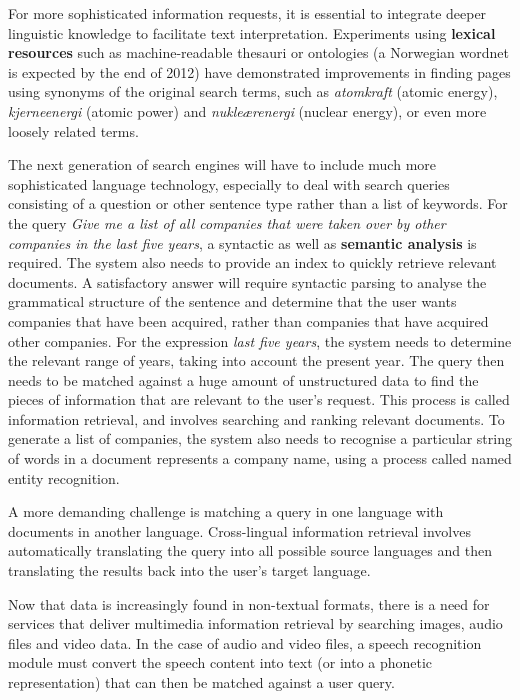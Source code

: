 \begin{multicols}{2}
For more sophisticated information requests, it is essential to integrate deeper linguistic knowledge to facilitate text interpretation. Experiments using \textbf{lexical resources} such as machine-readable thesauri or ontologies
(a Norwegian wordnet is expected by the end of 2012)
have demonstrated improvements in finding pages using synonyms of the original search terms, such as
\textit{atomkraft} (atomic energy), \textit{kjerneenergi} (atomic power) and \textit{nukleærenergi} (nuclear energy),
or even more loosely related terms.


The next generation of search engines will have to include much more sophisticated language technology, especially to deal with search queries consisting of a question or other sentence type rather than a list of keywords. For the query \textit{Give me a list of all companies that were taken over by other companies in the last five years}, a syntactic as well as \textbf{semantic analysis} is required. The system also needs to provide an index to quickly retrieve relevant documents. A satisfactory answer will require syntactic parsing to analyse the grammatical structure of the sentence and determine that the user wants companies that have been acquired, rather than companies that have acquired other companies. For the expression \textit{last five years}, the system needs to determine the relevant range of years, taking into account the present year. The query then needs to be matched against a huge amount of unstructured data to find the pieces of information that are relevant to the user’s request. This process is called information retrieval, and involves searching and ranking relevant documents. To generate a list of companies, the system also needs to recognise a particular string of words in a document represents a company name, using a process called named entity recognition.

A more demanding challenge is matching a query in one language with documents in another language. Cross-lingual information retrieval involves automatically translating the query into all possible source languages and then translating the results back into the user's target language.

Now that data is increasingly found in non-textual formats, there is a need for services that deliver multimedia information retrieval by searching images, audio files and video data. In the case of audio and video files, a speech recognition module must convert the speech content into text (or into a phonetic representation) that can then be matched against a user query.


\end{multicols}
